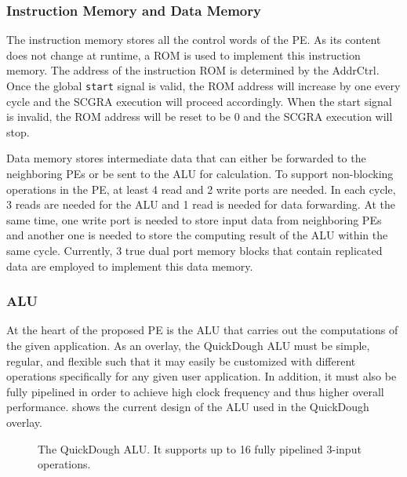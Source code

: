 \subsubsection{Instruction Memory and Data Memory}
The instruction memory stores all the control words of the PE.  As its content does not change at runtime, a ROM is used to implement this instruction memory. The address of the instruction ROM is determined by the AddrCtrl. Once the global
\texttt{start}
signal is valid, the ROM address will increase by one every cycle and the SCGRA execution will proceed accordingly. When the start signal is invalid, the ROM address will be reset to be 0 and the SCGRA execution will stop.

Data memory stores intermediate data that can either be forwarded to the neighboring PEs or be sent to the ALU for calculation.
To support non-blocking operations in the PE, at least 4 read and 2 write ports are needed.  In each cycle, 3 reads are needed for the ALU and 1 read is needed for data forwarding.  At the same time, one write port is needed to store input data from neighboring PEs and another one is needed to store the computing result of the ALU within the same cycle.
%
Currently, 3 true dual port memory blocks that contain replicated data are employed to implement this data memory.

\subsubsection{ALU}
At the heart of the proposed PE is the ALU that carries out the computations of the given application.  As an overlay, the QuickDough ALU must be simple, regular, and flexible such that it may easily be customized with different operations specifically for any given user application.  In addition, it must also be fully pipelined in order to achieve high clock frequency and thus higher overall performance.   shows the current design of the ALU used in the QuickDough overlay.

\begin{figure}
\caption{The QuickDough ALU. It supports up to 16 fully pipelined 3-input operations.}
\label{fig:ALU}
\end{figure} 

